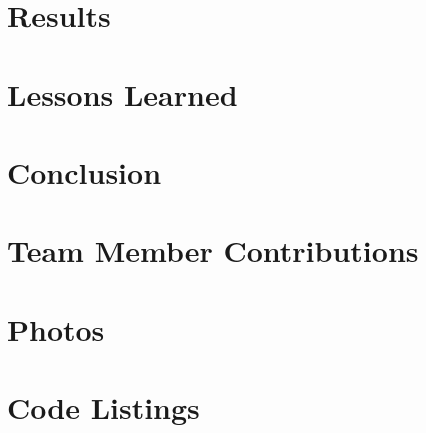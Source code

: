 \documentclass[12pt, letterpaper]{article}
\begin{document}
\section{Results}

\section{Lessons Learned}

\section{Conclusion}


\section{Team Member Contributions}

\appendix
\section{Photos}

\section{Code Listings}
\end{document}
